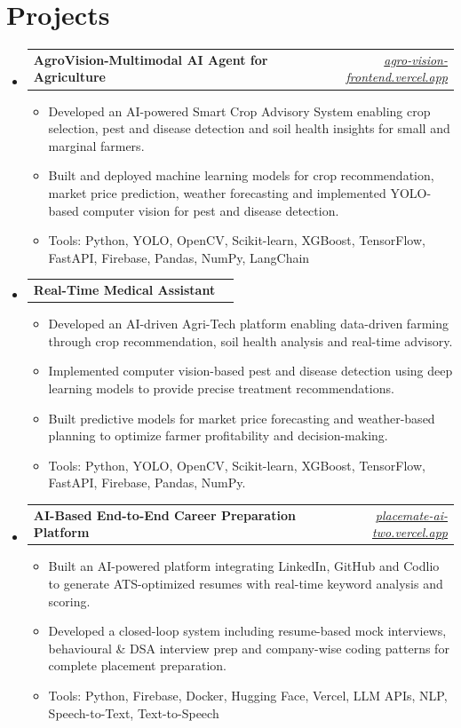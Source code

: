 \documentclass[9.5pt,letterpaper]{article}
\makeatletter
\newcommand{\resumeItem}[1]{%
  \item\small{#1\vspace{-1pt}}%
}
\newenvironment{resumeList}{%
  \begin{itemize}[
    leftmargin=0.18in,
    label=\textbullet,
    itemsep=1pt,
    topsep=3pt,
    parsep=0pt
  ]%
}{%
  \end{itemize}\vspace{-2pt}%
}
\newenvironment{outerList}{%
  \begin{itemize}[leftmargin=0pt, label={}, itemsep=0pt, topsep=0pt, parsep=0pt]%
}{%
  \end{itemize}%
}
\newcommand{\projectEntry}[2]{%
  \item[]
  \begin{tabularx}{\linewidth}{@{}X r@{}}
    \textbf{#1} & \small\textit{#2}
  \end{tabularx}\vspace{1pt}
}
\makeatother
\begin{document}
\vspace{2pt}
\section{Projects}
\begin{outerList}

  \projectEntry{AgroVision-Multimodal AI Agent for Agriculture}{\href{https://agro-vision-frontend.vercel.app}{agro-vision-frontend.vercel.app}}
  \vspace{-15pt}
  \begin{resumeList}
    \resumeItem{Developed an AI-powered Smart Crop Advisory System enabling crop selection, pest and disease detection and soil health insights for small and marginal farmers.}
    \resumeItem{Built and deployed machine learning models for crop recommendation, market price prediction, weather forecasting and implemented YOLO-based computer vision for pest and disease detection.}
    \resumeItem{Tools: Python, YOLO, OpenCV, Scikit-learn, XGBoost, TensorFlow, FastAPI, Firebase, Pandas, NumPy, LangChain}
  \end{resumeList}
\vspace{5pt}
  \projectEntry{Real-Time Medical Assistant}{}
  \vspace{-15pt}
  \begin{resumeList}
    \resumeItem{Developed an AI-driven Agri-Tech platform enabling data-driven farming through crop recommendation, soil health analysis and real-time advisory.}
    \resumeItem{Implemented computer vision-based pest and disease detection using deep learning models to provide precise treatment recommendations.}
    \resumeItem{Built predictive models for market price forecasting and weather-based planning to optimize farmer profitability and decision-making.}
    \resumeItem{Tools: Python, YOLO, OpenCV, Scikit-learn, XGBoost, TensorFlow, FastAPI, Firebase, Pandas, NumPy.}
  \end{resumeList}
\vspace{5pt}
  \projectEntry{AI-Based End-to-End Career Preparation Platform}{\href{https://placemate-ai-two.vercel.app}{placemate-ai-two.vercel.app}}
  \vspace{-15pt}
  \begin{resumeList}
    \resumeItem{Built an AI-powered platform integrating LinkedIn, GitHub and Codlio to generate ATS-optimized resumes with real-time keyword analysis and scoring.}
    \resumeItem{Developed a closed-loop system including resume-based mock interviews, behavioural \& DSA interview prep and company-wise coding patterns for complete placement preparation.}
    \resumeItem{Tools: Python, Firebase, Docker, Hugging Face, Vercel, LLM APIs, NLP, Speech-to-Text, Text-to-Speech}
  \end{resumeList}

\end{outerList}
\end{document}
